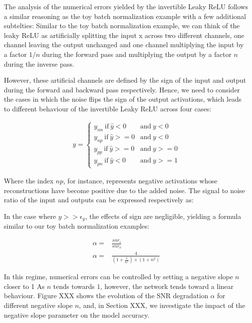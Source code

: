 \documentclass[twocolumn]{bmcart}
\begin{document}
The analysis of the numerical errors yielded by the invertible Leaky ReLU follows a similar reasoning as the toy batch normalization example with a few additional subtelties:
Similar to the toy batch normalization example, we can think of the leaky ReLU as artificially splitting the input x across two different channels, one channel leaving the output unchanged and one channel multiplying the input by a factor $1/n$ during the forward pass and multiplying the output by a factor $n$ during the inverse pass.

However, these artificial channels are defined by the sign of the input and output during the forward and backward pass respectively.
Hence, we need to consider the cases in which the noise flips the sign of the output activations, 
which leads to different behaviour of the invertible Leaky ReLU across four cases: 

\begin{subequations}
\begin{align}
y = \begin{cases}
y_{nn} \  \text{if}\  \hat{y}<0    &\text{and}\  y<0  \\
y_{np} \  \text{if}\  \hat{y}>=0   &\text{and}\  y<0  \\
y_{pp} \  \text{if}\  \hat{y}>=0   &\text{and}\  y>=0 \\
y_{pn} \  \text{if}\  \hat{y}<0    &\text{and}\  y>=1 
\end{cases} 
\end{align}
\end{subequations}

Where the index $np$, for instance, represents negative activations whose reconstructions have become positive due to the added noise. 
The signal to noise ratio of the input and outputs can be expressed respectively as:

In the case where $y >> \epsilon_y$, the effects of sign are negligible, yielding a formula similar to our toy batch normalization examples:

\begin{subequations}
\begin{align}
\alpha =& \frac{snr_i}{snr_o} \\
\alpha =& \frac{4}{(1+\frac{1}{n^2}) \times (1 + n^2)}
\end{align}
\end{subequations}

In this regime, numerical errors can be controlled by setting a negative slope $n$ closer to 1
As $n$ tends towards $1$, however, the network tends toward a linear behaviour. 
Figure XXX shows the evolution of the SNR degradation $\alpha$ for different negative slope $n$, and,
in Section XXX, we investigate the impact of the negative slope parameter on the model accuracy.
\end{document}
